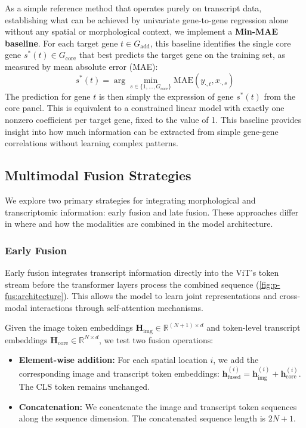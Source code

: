 As a simple reference method that operates purely on transcript data, establishing what can be achieved
by univariate gene-to-gene regression alone without any spatial or morphological context, we implement a 
\textbf{Min-MAE baseline}. For each target gene $t\in G_{\text{add}}$, this baseline identifies the single core gene $s^{\ast}(t)\in G_{\text{core}}$ that best predicts the target gene on the training set, as measured by mean absolute error (MAE):
\begin{equation}
s^{\ast}(t)=\arg\min_{s\in\{1,\dots,G_{\text{core}}\}}\mathrm{MAE}\!\left(y_{\cdot,t},x_{\cdot,s}\right)
\end{equation}
The prediction for gene $t$ is then simply the expression of gene $s^{\ast}(t)$ from the core panel. This is equivalent to a constrained linear model with exactly one nonzero coefficient per target gene, fixed to the value of 1. This baseline provides insight into how much information can be extracted from simple gene-gene correlations without learning complex patterns.

\subsection*{Multimodal Fusion Strategies}
\label{sec:multimodal-fusion-strategies}

We explore two primary strategies for integrating morphological and transcriptomic information: early fusion and late fusion. These approaches differ in where and how the modalities are combined in the model architecture.

\subsubsection{Early Fusion}
\label{sec:early-fusion}

Early fusion integrates transcript information directly into the ViT's token stream before the transformer layers process the combined sequence (\autoref{fig:p-fus:architecture}). This allows the model to learn joint representations and cross-modal interactions through self-attention mechanisms.

Given the image token embeddings $\mathbf{H}_{\text{img}}\in\mathbb{R}^{(N+1)\times d}$ and token-level transcript embeddings $\mathbf{H}_{\text{core}}\in\mathbb{R}^{N\times d}$, we test two fusion operations:

\begin{itemize}
\item \textbf{Element-wise addition:} For each spatial location $i$, we add the corresponding image and transcript token embeddings: $\mathbf{h}_{\text{fused}}^{(i)} = \mathbf{h}_{\text{img}}^{(i)} + \mathbf{h}_{\text{core}}^{(i)}$. The CLS token remains unchanged.

\item \textbf{Concatenation:} We concatenate the image and transcript token sequences along the sequence dimension. The concatenated sequence length is $2N+1$.
\end{itemize}

